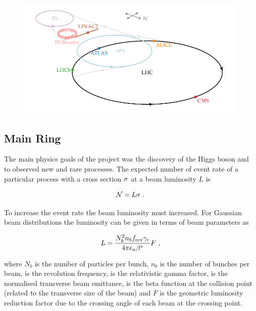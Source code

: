 \begin{figure}[!htbp]
    \centering
    \includegraphics{diagrams/tikz/lhc_complex/lhc_complex.pdf}
    \caption{\cite{Mobs:2197559}}
    \label{fig:LHC-Complex}
\end{figure}

\subsection{\LHC Main Ring}

The main physics goals of the \LHC project was the discovery of the Higgs boson
and to observed new and rare \SM processes. The expected number of event rate of
a particular process with a cross section $\sigma$ at a beam luminosity
$L$ is

\begin{equation}
    \mathcal{N} = L \sigma \ .
\end{equation}

To increase the event rate the beam luminosity must increased. For Gaussian
beam distributions the luminosity can be given in terms of beam parameters as

\begin{equation}
    \label{eq:beam-lumi}
    L = \frac{N_b^2 n_b\frev\relgamma}{4\pi\emitt\bstar} F\ ,
\end{equation}

where $N_b$ is the number of particles per bunch, $n_b$ is the number of bunches
per beam, \frev is the revolution frequency, \relgamma is the relativistic gamma
factor, \emitt is the normalised transverse beam emittance, \bstar is the beta
function at the collision point (related to the transverse size of the beam) and
$F$ is the geometric luminosity reduction factor due to the crossing angle of
each beam at the crossing point.

